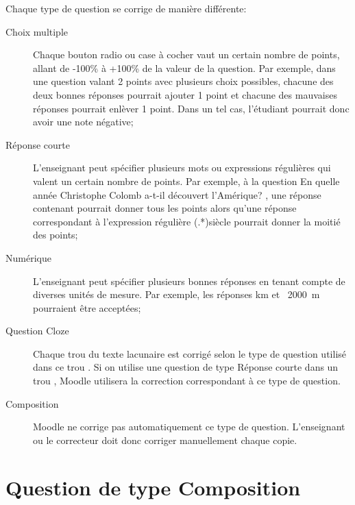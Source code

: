 \begin{minipage}{\linewidth}
Chaque type de question se corrige de mani\`ere diff\'erente:
\begin{description}
  \item[Choix multiple]
  
  Chaque bouton radio ou case \`a cocher vaut un certain nombre de points, allant de -100\% \`a +100\% de la valeur de la question.
  Par exemple, dans une question valant 2 points avec plusieurs choix possibles, chacune des deux bonnes r\'eponses pourrait ajouter 1 point et chacune des mauvaises r\'eponses pourrait enl\`ever 1 point.
  Dans un tel cas, l'\'etudiant pourrait donc avoir une note n\'egative;
  
  \item[R\'eponse courte]
  
  L'enseignant peut sp\'ecifier plusieurs mots ou expressions r\'eguli\`eres qui valent un certain nombre de points. Par exemple,
  \`a la question \og{} En quelle ann\'ee Christophe Colomb a-t-il d\'ecouvert l'Am\'erique? \fg{}, une r\'eponse contenant  \fg{} pourrait donner tous les points alors qu'une r\'eponse correspondant \`a l'expression r\'eguli\`ere (.*)si\`ecle \fg{} pourrait donner la moiti\'e des points;
  
  \item[Num\'erique]
  
  L'enseignant peut sp\'ecifier plusieurs bonnes r\'eponses en tenant compte de diverses unit\'es de mesure.
  Par exemple, les r\'eponses  km \fg{} et  \og~2000~m~\fg{} pourraient \^etre accept\'ees;
  
  \item[Question Cloze]
  
  Chaque \og trou \fg{} du texte lacunaire est corrig\'e selon le type de question utilis\'e dans ce \og trou \fg{}.
  Si on utilise une question de type R\'eponse courte dans un \og trou \fg{}, Moodle utilisera la correction correspondant \`a ce type de question.
  
  \item[Composition]
  
  Moodle ne corrige pas automatiquement ce type de question.
  L'enseignant ou le correcteur doit donc corriger manuellement chaque copie.
\end{description}
\end{minipage}

\section{Question de type Composition}

